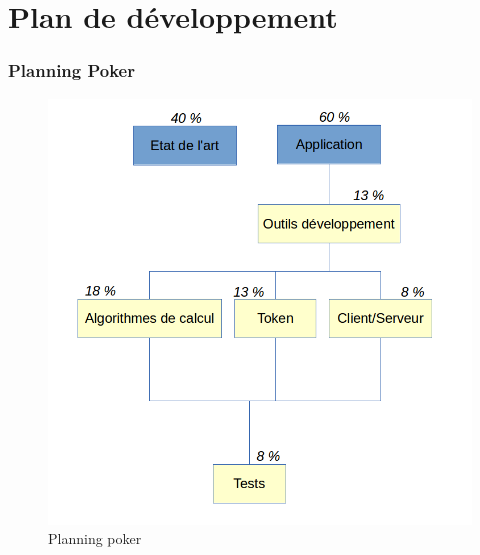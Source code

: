 \documentclass[xcolor=table]{beamer}
\begin{document}
\section{Plan de développement}
\begin{frame}
\frametitle{Planning Poker}
  \begin{figure}
    \includegraphics[scale=0.3]{img/planningpoker.png} %
    \caption{Planning poker}
  \end{figure}
\end{frame}
\end{document}
